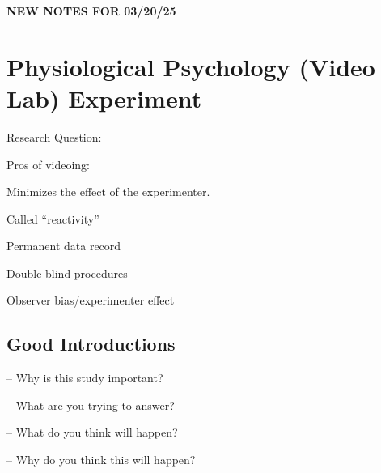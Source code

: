 \begin{center}
    \textbf{NEW NOTES FOR 03/20/25} \\
    \hrulefill
\end{center}

\section{Physiological Psychology (Video Lab) Experiment}

Research Question: 

\begin{coloredlist}
    \item Pros of videoing:
    \begin{coloredlist}
        \item Minimizes the effect of the experimenter.
        \begin{coloredlist}
            \item Called ``reactivity''
        \end{coloredlist}
        \item Permanent data record
        \item Double blind procedures
        \begin{coloredlist}
            \item Observer bias/experimenter effect
        \end{coloredlist}
    \end{coloredlist}
\end{coloredlist}

\subsection{Good Introductions}

\begin{coloredlist}
    \item {} -- Why is this study important?
    \begin{coloredlist}
        \item 
    \end{coloredlist}
    \item {} -- What are you trying to answer?
    \item {} -- What do you think will happen?
    \item {} -- Why do you think this will happen?
    \item 
\end{coloredlist}

